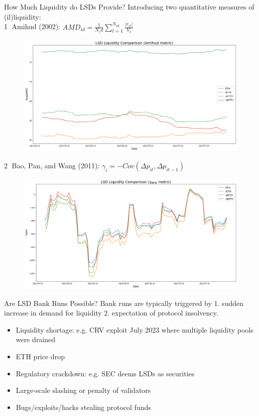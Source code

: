 \documentclass{beamer}
\begin{document}
\begin{frame}{How Much Liquidity do LSDs Provide?}
    Introducing two quantitative measures of (il)liquidity:\\
    \textcircled{1} Amihud (2002):
    $AMD_{id} = \frac{1}{N_id}\sum_{t=1}^{N_{id}}\frac{|r_{it}|}{V_t}$
    \begin{figure}
        \centering
        \includegraphics[width=\textwidth]{figures/liq_AMD.png}
    \end{figure}
\end{frame}

\begin{frame}
    \textcircled{2} Bao, Pan, and Wang (2011): $\gamma_i = -Cov(\Delta p_{it}, \Delta p_{it-1})$
    \begin{figure}
        \centering
        \includegraphics[width=\textwidth]{figures/liq_BPW.png}
    \end{figure}
\end{frame}

\begin{frame}{Are LSD Bank Runs Possible?}
    Bank runs are typically triggered by 1. sudden increase in demand for liquidity 2. expectation of protocol insolvency.\\  
    \bigskip
    \begin{itemize}
        \item Liquidity shortage: e.g. CRV exploit July 2023 where multiple liquidity pools were drained
        \item ETH price drop
        \item Regulatory crackdown: e.g. SEC deems LSDs as securities
        \item Large-scale slashing or penalty of validators
        \item Bugs/exploits/hacks stealing protocol funds
    \end{itemize}
\end{frame}
\end{document}
